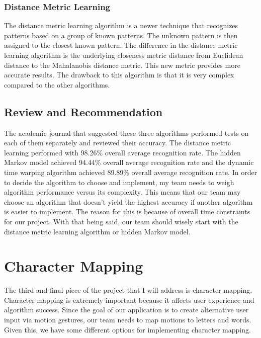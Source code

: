 \documentclass[onecolumn, draftclsnofoot,10pt, journal, letterpaper]{IEEEtran}
\begin{document}
        \subsubsection{Distance Metric Learning}
            The distance metric learning algorithm is a newer technique that recognizes patterns based on a group of known patterns. The unknown pattern is then assigned to the closest known pattern. The difference in the distance metric learning algorithm is the underlying closeness metric distance from Euclidean distance to the Mahalanobis distance metric. This new metric provides more accurate results. The drawback to this algorithm is that it is very complex compared to the other algorithms. 
    
    \subsection{Review and Recommendation}
        The academic journal that suggested these three algorithms performed tests on each of them separately and reviewed their accuracy. The distance metric learning performed with 98.26\% overall average recognition rate. The hidden Markov model achieved 94.44\% overall average recognition rate and the dynamic time warping algorithm achieved 89.89\% overall average recognition rate. In order to decide the algorithm to choose and implement, my team needs to weigh algorithm performance versus its complexity. This means that our team may choose an algorithm that doesn't yield the highest accuracy if another algorithm is easier to implement. The reason for this is because of overall time constraints for our project. With that being said, our team should wisely start with the distance metric learning algorithm or hidden Markov model.
    
\section{Character Mapping}
    The third and final piece of the project that I will address is character mapping. Character mapping is extremely important because it affects user experience and algorithm success. Since the goal of our application is to create alternative user input via motion gestures, our team needs to map motions to letters and words. Given this, we have some different options for implementing character mapping. 
    
\end{document}
